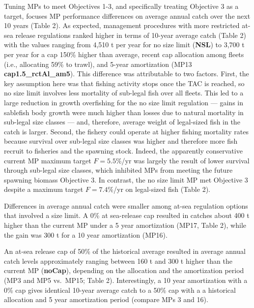\documentclass[11pt]{book}
\begin{document}
Tuning MPs to meet Objectives 1-3, and specifically treating Objective 3 as a target, focuses MP performance differences on average annual catch over the next 10 years (Table 2). As expected, management procedures with more restricted at-sea release regulations ranked higher in terms of 10-year average catch (Table 2) with the values ranging from 4,510 t per year for no size limit (\textbf{NSL}) to 3,700 t per year for a cap 150\% higher than average, recent cap allocation among fleets (i.e., allocating 59\% to trawl), and 5-year amortization (MP13 \textbf{cap1.5\_rctAl\_am5}). This difference was attributable to two factors. First, the key assumption here was that fishing activity stops once the TAC is reached, so no size limit involves less mortality of sub-legal fish over all fleets. This led to a large reduction in growth overfishing for the no size limit regulation --- gains in sablefish body growth were much higher than losses due to natural mortality in sub-legal size classes --- and, therefore, average weight of legal-sized fish in the catch is larger. Second, the fishery could operate at higher fishing mortality rates because survival over sub-legal size classes was higher and therefore more fish recruit to fisheries and the spawning stock. Indeed, the apparently conservative current MP maximum target \(F=5.5\%\)/yr was largely the result of lower survival through sub-legal size classes, which inhibited MPs from meeting the future spawning biomass Objective 3. In contrast, the no size limit MP met Objective 3 despite a maximum target \(F=7.4\%\)/yr on legal-sized fish (Table 2).

Differences in average annual catch were smaller among at-sea regulation options that involved a size limit. A 0\% at sea-release cap resulted in catches about 400 t higher than the current MP under a 5 year amortization (MP17, Table 2), while the gain was 300 t for a 10 year amortization (MP16).

An at-sea release cap of 50\% of the historical average resulted in average annual catch levels approximately ranging between 160 t and 300 t higher than the current MP (\textbf{noCap}), depending on the allocation and the amortization period (MP3 and MP5 vs.~MP15; Table 2). Interestingly, a 10 year amortization with a 0\% cap gives identical 10-year average catch to a 50\% cap with a a historical allocation and 5 year amortization period (compare MPs 3 and 16).
\end{document}
